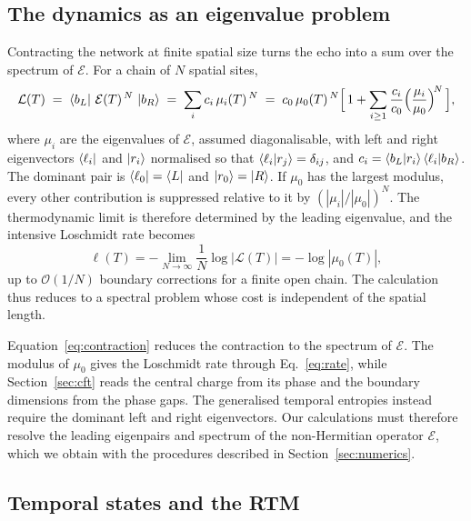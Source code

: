 \subsection{The dynamics as an eigenvalue problem}
\label{sec:transverse:eigenproblem}

Contracting the network at finite spatial size turns the echo into a sum over the spectrum of $\mathcal{E}$. For a chain of $N$ spatial sites,
\begin{equation}
  \mathcal{L}(T)
  \;=\; \bra{b_L}\,\mathcal{E}(T)^{\,N}\,\ket{b_R}
  \;=\; \sum_i c_i\,\mu_i(T)^{\,N}
  \;=\; c_0\,\mu_0(T)^{\,N}
  \Big[\,1+\sum_{i\ge1}\frac{c_i}{c_0}\Big(\frac{\mu_i}{\mu_0}\Big)^{\!N}\,\Big],
  \label{eq:contraction}
\end{equation}
where $\mu_i$ are the eigenvalues of $\mathcal{E}$, assumed diagonalisable, with left and right eigenvectors $\bra{\ell_i}$ and $\ket{r_i}$ normalised so that $\braket{\ell_i}{r_j}=\delta_{ij}$, and $c_i=\braket{b_L}{r_i}\braket{\ell_i}{b_R}$. The dominant pair is $\bra{\ell_0}=\bra{L}$ and $\ket{r_0}=\ket{R}$. If $\mu_0$ has the largest modulus, every other contribution is suppressed relative to it by $(|\mu_i|/|\mu_0|)^N$. The thermodynamic limit is therefore determined by the leading eigenvalue, and the intensive Loschmidt rate becomes
\begin{equation}
  \ell(T) = -\lim_{N\to\infty}\frac{1}{N}\log|\mathcal{L}(T)|
  = -\log|\mu_0(T)|,
  \label{eq:rate}
\end{equation}
up to $\mathcal{O}(1/N)$ boundary corrections for a finite open chain. The calculation thus reduces to a spectral problem whose cost is independent of the spatial length.

Equation~\eqref{eq:contraction} reduces the contraction to the spectrum of $\mathcal{E}$. The modulus of $\mu_0$ gives the Loschmidt rate through Eq.~\eqref{eq:rate}, while Section~\ref{sec:cft} reads the central charge from its phase and the boundary dimensions from the phase gaps. The generalised temporal entropies instead require the dominant left and right eigenvectors. Our calculations must therefore resolve the leading eigenpairs and spectrum of the non-Hermitian operator $\mathcal{E}$, which we obtain with the procedures described in Section~\ref{sec:numerics}.

\subsection{Temporal states and the \ac{RTM}}
\label{sec:transverse:entropies}

